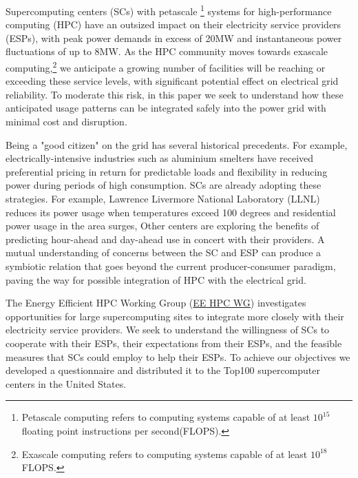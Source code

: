 Supercomputing centers (SCs) with petascale
\footnote{Petascale computing refers to computing systems capable of at
least \(10^{15}\) floating point instructions per second(FLOPS).} 
systems for high-performance computing (HPC) have an outsized 
impact on their electricity service providers (ESPs), with peak 
power demands in excess of 20MW and instantaneous power fluctuations of up to 8MW. 
As the HPC community moves towards exascale computing,\footnote{Exascale computing refers to computing systems capable of at
least \(10^{18}\)FLOPS.} we anticipate a growing number of facilities will
be reaching or exceeding these service levels, with significant potential 
effect on electrical grid reliability.
To moderate this risk, in this paper we seek to understand how these anticipated
usage patterns can be integrated safely into the power grid with minimal cost 
and disruption.

Being a "good citizen" on the grid has several historical precedents.
For example, electrically-intensive industries such as aluminium smelters 
have received preferential pricing in return for predictable loads and
flexibility in reducing power during periods of high consumption.
SCs are already adopting these strategies.  
For example, Lawrence Livermore National Laboratory (LLNL)
reduces its power usage when temperatures exceed 
100 degrees and residential power usage in the area surges,
Other centers are exploring the benefits of predicting hour-ahead and 
day-ahead use in concert with their providers.
A mutual understanding of concerns between the SC and ESP can 
produce a symbiotic relation that goes beyond the current producer-consumer 
paradigm, paving the way for possible integration of HPC with the electrical grid.

The Energy Efficient HPC Working Group (\href {http://eehpcwg.lbl.gov/}{EE HPC WG})  
investigates opportunities for large supercomputing sites to  
integrate more closely with their electricity service providers.
We seek to understand the willingness of SCs to
cooperate with their ESPs, their expectations from their ESPs, and the feasible measures
that SCs could employ to help their ESPs.
To achieve our objectives we developed a questionnaire and distributed it to 
the Top100 supercomputer centers in the United States. 


